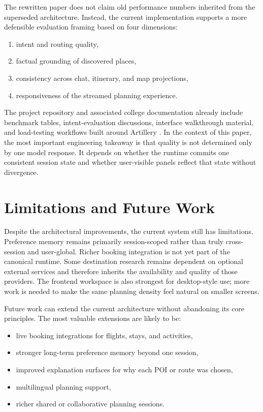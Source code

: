 \documentclass[conference]{IEEEtran}
\begin{document}
The rewritten paper does not claim old performance numbers inherited from the superseded architecture. Instead, the current implementation supports a more defensible evaluation framing based on four dimensions:

\begin{enumerate}
  \item intent and routing quality,
  \item factual grounding of discovered places,
  \item consistency across chat, itinerary, and map projections,
  \item responsiveness of the streamed planning experience.
\end{enumerate}

The project repository and associated college documentation already include benchmark tables, intent-evaluation discussions, interface walkthrough material, and load-testing workflows built around Artillery \cite{artillery2024}. In the context of this paper, the most important engineering takeaway is that quality is not determined only by one model response. It depends on whether the runtime commits one consistent session state and whether user-visible panels reflect that state without divergence.

\section{Limitations and Future Work}

Despite the architectural improvements, the current system still has limitations. Preference memory remains primarily session-scoped rather than truly cross-session and user-global. Richer booking integration is not yet part of the canonical runtime. Some destination research remains dependent on optional external services and therefore inherits the availability and quality of those providers. The frontend workspace is also strongest for desktop-style use; more work is needed to make the same planning density feel natural on smaller screens.

Future work can extend the current architecture without abandoning its core principles. The most valuable extensions are likely to be:

\begin{itemize}
  \item live booking integrations for flights, stays, and activities,
  \item stronger long-term preference memory beyond one session,
  \item improved explanation surfaces for why each POI or route was chosen,
  \item multilingual planning support,
  \item richer shared or collaborative planning sessions.
\end{itemize}
\end{document}
